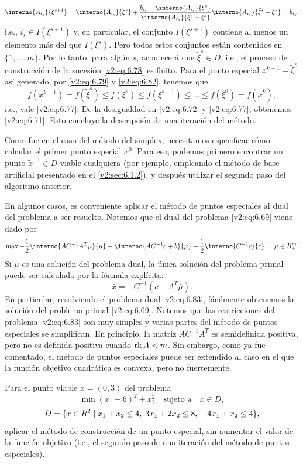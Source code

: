 \[
    \interno{A_{i_s}}{\xi^{s+1}} = \interno{A_{i_s}}{\xi^s} + \frac{b_{i_s} - \interno{A_{i_s}}{\xi^s}}{\interno{A_{i_s}}{\tilde{\xi}^s - \xi^s}} \interno{A_{i_s}}{\tilde{\xi}^s - \xi^s} = b_{i_s},
\]
i.e., $i_s \in I(\xi^{s+1})$ y, en particular, el conjunto $I(\xi^{s+1})$ contiene al menos un elemento más del que $I(\xi^s)$. Pero todos estos conjuntos están contenidos en $\{1, \dots, m\}$. Por lo tanto, para algún $s$, acontecerá que $\tilde{\xi}^s \in D$, i.e., el proceso de construcción de la sucesión \eqref{v2:eq:6.78} es finito. Para el punto especial $x^{k+1} = \tilde{\xi}^s$ así generado, por \eqref{v2:eq:6.79} y \eqref{v2:eq:6.82}, tenemos que
\[
    f(x^{k+1}) = f(\tilde{\xi}^s) \le f(\xi^s) \le f(\xi^{s-1}) \le \dots \le f(\xi^0) = f(\tilde{x}^k),
\]
i.e., vale \eqref{v2:eq:6.77}. De la desigualdad en \eqref{v2:eq:6.72} y \eqref{v2:eq:6.77}, obtenemos \eqref{v2:eq:6.71}. Esto concluye la descripción de una iteración del método.

Como fue en el caso del método del simplex, necesitamos especificar cómo calcular el primer punto especial $x^0$. Para eso, podemos primero encontrar un punto $\tilde{x}^{-1} \in D$ viable cualquiera (por ejemplo, empleando el método de base artificial presentado en el \cref{v2:sec:6.1.2}), y después utilizar el segundo paso del algoritmo anterior.

En algunos casos, es conveniente aplicar el método de puntos especiales al dual del problema a ser resuelto. Notemos que el dual del problema \eqref{v2:eq:6.69} viene dado por
\begin{equation}
    \max -\frac{1}{2}\interno{AC^{-1}A^T \mu}{\mu} - \interno{AC^{-1}c + b}{\mu} - \frac{1}{2}\interno{C^{-1}c}{c}, \quad \mu \in \R^m_+.
    \label{v2:eq:6.83}
\end{equation}
Si $\bar{\mu}$ es una solución del problema dual, la única solución del problema primal puede ser calculada por la fórmula explícita:
\[
    \bar{x} = -C^{-1}(c + A^T \bar{\mu}).
\]
En particular, resolviendo el problema dual \eqref{v2:eq:6.83}, fácilmente obtenemos la solución del problema primal \eqref{v2:eq:6.69}. Notemos que las restricciones del problema \eqref{v2:eq:6.83} son muy simples y varias partes del método de puntos especiales se simplifican. En principio, la matriz $AC^{-1}A^T$ es semidefinida positiva, pero no es definida positiva cuando $\operatorname{rk} A < m$. Sin embargo, como ya fue comentado, el método de puntos especiales puede ser extendido al caso en el que la función objetivo cuadrática es convexa, pero no fuertemente.

\begin{exercise}\label{v2:ejer:6.2.3}
    Para el punto viable $\tilde{x} = (0, 3)$ del problema
    \[
        \min (x_1 - 6)^2 + x_2^2 \quad \text{sujeto a} \quad x \in D,
    \]
    \[
        D = \{ x \in R^2 \mid x_1 + x_2 \le 4, \; 3x_1 + 2x_2 \le 8, \; -4x_1 + x_2 \le 4 \},
    \]
    aplicar el método de construcción de un punto especial, sin aumentar el valor de la función objetivo (i.e., el segundo paso de una iteración del método de puntos especiales).
\end{exercise}
